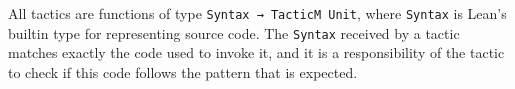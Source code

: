 All tactics are functions of type \texttt{Syntax → TacticM Unit}, where \texttt{Syntax}
is Lean's builtin type for representing source code. The \texttt{Syntax} received by
a tactic matches exactly the code used to invoke it, and it is a responsibility of the
tactic to check if this code follows the pattern that is expected.

